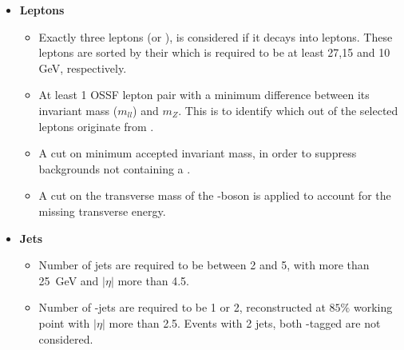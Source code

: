 \begin{itemize}
  \item \textbf{Leptons}
    \begin{itemize}
      \item Exactly three leptons (\Pelectron or \Pmu), 
      \Ptau is considered if it decays into leptons. These leptons are 
      sorted by their \pT which is required to be at least 27,15 and 10 GeV, respectively.
      
      \item At least 1 OSSF lepton pair with a minimum
      difference between its invariant mass ($m_{ll}$) and $m_Z$. This is to identify 
      which out of the selected leptons originate from \PZ.

      \item A cut on minimum accepted invariant mass, in order to suppress backgrounds 
      not containing a \PZ.

      \item A cut on the transverse mass of the \PW-boson is applied to account for the missing
      transverse energy. 
  \end{itemize}
  \item \textbf{Jets}
  \begin{itemize}
    \item Number of jets are required to be between 2 and 5, with \pT more than \qty{25}{GeV}
    and $|\eta|$ more than 4.5.
    \item Number of \Pbottom-jets are required to be 1 or 2, reconstructed at $85\%$ working 
    point with $|\eta|$ more than 2.5. Events with 2 jets, both \Pbottom-tagged are not considered.
  \end{itemize}


\end{itemize}

